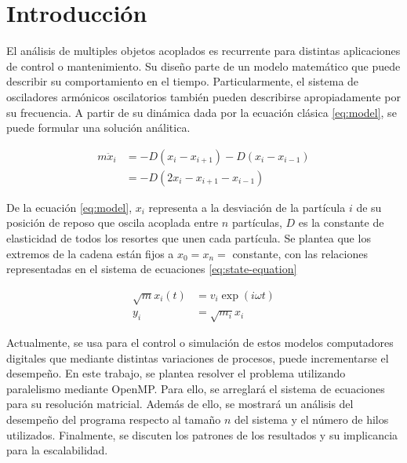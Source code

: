 \section{Introducción}
El análisis de multiples objetos acoplados es recurrente para distintas aplicaciones de control o mantenimiento. Su diseño parte de un modelo matemático que puede describir su comportamiento en el tiempo. Particularmente, el sistema de osciladores armónicos oscilatorios también pueden describirse apropiadamente por su frecuencia. A partir de su dinámica dada por la ecuación clásica \ref{eq:model}, se puede formular una solución análitica.

\begin{equation}
	\begin{split}
	m \ddot x_i & = -D(x_i - x_{i+1}) - D(x_i - x_{i-1}) \\
	& = -D(2x_i - x_{i+1} - x_{i-1})         
	\end{split}
	\label{eq:model}
\end{equation}

De la ecuación \ref{eq:model}, $x_i$ representa a la desviación de la partícula $i$ de su posición de reposo que oscila acoplada entre $n$ partículas, $D$ es la constante de elasticidad de todos los resortes que unen cada partícula. Se plantea que los extremos de la cadena están fijos a $x_0 = x_n = $ constante, con las relaciones representadas en el sistema de ecuaciones \ref{eq:state-equation}

\begin{equation}
	\begin{split}
		\sqrt{m} x_i(t) &= v_i \exp(i \omega t) 
		 \\
		 y_i &= \sqrt{m_i}x_i 
	\end{split}
	\label{eq:state-equation}
\end{equation}

Actualmente, se usa para el control o simulación de estos modelos computadores digitales que mediante distintas variaciones de procesos, puede incrementarse el desempeño. En este trabajo, se plantea resolver el problema utilizando paralelismo mediante OpenMP. Para ello, se arreglará el sistema de ecuaciones para su resolución matricial. Además de ello, se mostrará un análisis del desempeño del programa respecto al tamaño $n$ del sistema y el número de hilos utilizados. Finalmente, se discuten los patrones de los resultados y su implicancia para la escalabilidad.




